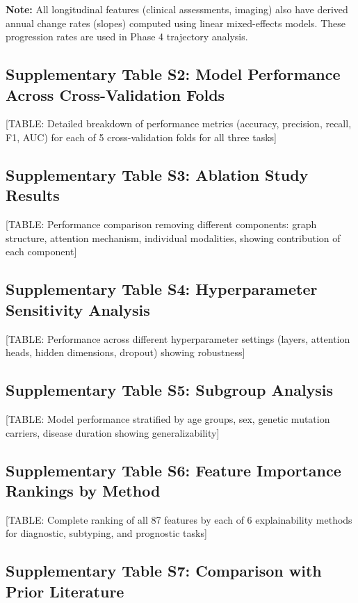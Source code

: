 \documentclass[11pt]{article}
\begin{document}
\textbf{Note:} All longitudinal features (clinical assessments, imaging) also have derived annual change rates (slopes) computed using linear mixed-effects models. These progression rates are used in Phase 4 trajectory analysis.

\subsection{Supplementary Table S2: Model Performance Across Cross-Validation Folds}

[TABLE: Detailed breakdown of performance metrics (accuracy, precision, recall, F1, AUC) for each of 5 cross-validation folds for all three tasks]

\subsection{Supplementary Table S3: Ablation Study Results}

[TABLE: Performance comparison removing different components: graph structure, attention mechanism, individual modalities, showing contribution of each component]

\subsection{Supplementary Table S4: Hyperparameter Sensitivity Analysis}

[TABLE: Performance across different hyperparameter settings (layers, attention heads, hidden dimensions, dropout) showing robustness]

\subsection{Supplementary Table S5: Subgroup Analysis}

[TABLE: Model performance stratified by age groups, sex, genetic mutation carriers, disease duration showing generalizability]

\subsection{Supplementary Table S6: Feature Importance Rankings by Method}

[TABLE: Complete ranking of all 87 features by each of 6 explainability methods for diagnostic, subtyping, and prognostic tasks]

\subsection{Supplementary Table S7: Comparison with Prior Literature}
\end{document}
